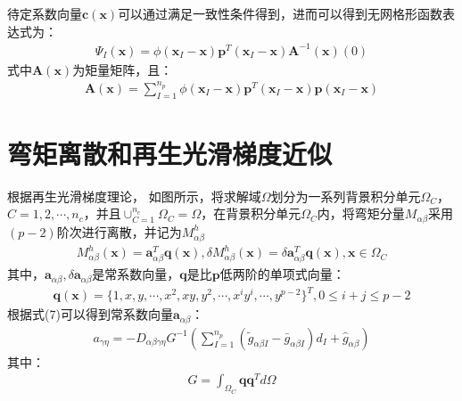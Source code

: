 \documentclass[a4paper]{article}
\begin{document}
待定系数向量$\pmb{c}(\pmb{x})$可以通过满足一致性条件得到，进而可以得到无网格形函数表达式为：
\begin{equation}
\begin{split}
\Psi_I(\pmb{x})=\phi(\pmb{x}_I-\pmb{x})\pmb{p}^T(\pmb{x}_I-\pmb{x})\pmb{A}^{-1}(\pmb{x})(0)
\end{split}
\end{equation}
式中$\pmb{A}(\pmb{x})$为矩量矩阵，且：
\begin{equation}
\begin{split}
    \pmb{A}(\pmb{x})=\sum_{I=1}^{n_p}\phi(\pmb{x}_I-\pmb{x})\pmb{p}^T(\pmb{x}_I-\pmb{x})\pmb{p}(\pmb{x}_I-\pmb{x})
\end{split}
\end{equation}
\section{弯矩离散和再生光滑梯度近似}
根据再生光滑梯度理论，
如图所示，将求解域$\Omega$划分为一系列背景积分单元$\Omega_C$，$C=1,2,\dotsb,n_c$，并且$\cup_{C=1}^{n_c}\Omega_C=\Omega$，在背景积分单元$\Omega_C$内，将弯矩分量$M_{\alpha\beta}$采用$(p-2)$阶次进行离散，并记为$M_{\alpha\beta}^h$
\begin{equation}
\begin{split}
    M_{\alpha\beta}^h(\pmb{x})=\pmb{a}^T_{\alpha\beta}\pmb{q}(\pmb{x}),\delta M_{\alpha\beta}^h(\pmb{x})=\delta \pmb{a}^T_{\alpha\beta}\pmb{q}(\pmb{x}),\pmb{x}\in\Omega_C
\end{split}
\end{equation}
其中，$\pmb a_{\alpha\beta},\delta \pmb a_{\alpha\beta}$是常系数向量，$\pmb{q}$是比$\pmb{p}$低两阶的单项式向量：
\begin{equation}
\begin{split}
    \pmb{q}(\pmb{x})=\{1,x,y,\dotsb,x^2,xy,y^2,\dotsb,x^iy^i,\dotsb,y^{p-2}\}^T,0\le i+j\le p-2
\end{split}
\end{equation}
根据式(7)可以得到常系数向量$\pmb{a}_{\alpha\beta}$：
\begin{equation}
\begin{split}
    a_{\gamma\eta}=-D_{\alpha\beta\gamma\eta}G^{-1}(\sum_{I=1}^{n_p}(\tilde{g}_{\alpha\beta I}-\bar{g}_{\alpha\beta I})d_I+\hat{g}_{\alpha\beta})
\end{split}
\end{equation}
其中：
\begin{equation}
\begin{split}
    G=\int_{\Omega_C}\pmb{q}\pmb{q}^Td\Omega
\end{split}
\end{equation}
\end{document}
